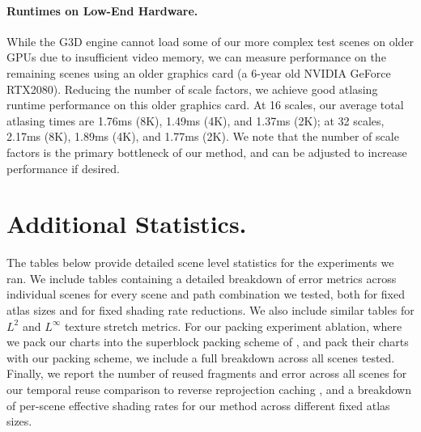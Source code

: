 \paragraph*{Runtimes on Low-End Hardware.}
While the G3D engine cannot load some of our more complex test scenes on older GPUs due to insufficient video memory, we can measure performance on the remaining scenes using an older graphics card (a 6-year old NVIDIA GeForce RTX2080). Reducing the number of scale factors, we achieve good atlasing runtime performance on this older graphics card. At 16 scales, our average total atlasing times are 1.76ms (8K), 1.49ms (4K), and 1.37ms (2K); at 32 scales, 2.17ms (8K), 1.89ms (4K), and 1.77ms (2K). We note that the number of scale factors is the primary bottleneck of our method, and can be adjusted to increase performance if desired.





\section{Additional Statistics.}

The tables below provide detailed scene level statistics for the experiments we ran. We include tables containing a detailed breakdown of \FLIP error metrics across individual scenes for every scene and path combination we tested, both for fixed atlas sizes and for fixed shading rate reductions. We also include similar tables for $L^2$ and $L^{\infty}$ texture stretch metrics. For our packing experiment ablation, where we pack our charts into the superblock packing scheme of \cite{Neff2022MSA}, and pack their charts with our packing scheme, we include a full breakdown across all scenes tested. Finally, we report the number of reused fragments and \FLIP error across all scenes for our temporal reuse comparison to reverse reprojection caching \cite{nehab2007accelerating}, and a breakdown of per-scene effective shading rates for our method across different fixed atlas sizes.












